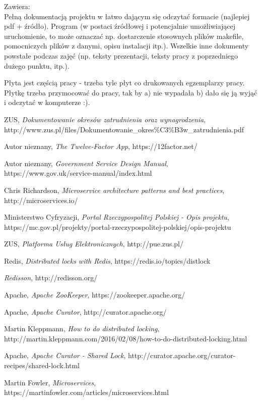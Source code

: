 \documentclass[licencjacka]{pracamgr}
\begin{document}
Zawiera:\\
Pełną dokumentacją projektu w łatwo dającym się odczytać formacie (najlepiej pdf + źródło).
Program (w postaci źródłowej i potencjalnie umożliwiającej uruchomienie, to może oznaczać np. dostarczenie stosownych plików makefile, pomocniczych plików z danymi, opisu instalacji itp.).
Wszelkie inne dokumenty powstałe podczas zajęć (np. teksty prezentacji, teksty pracy z poprzedniego dużego punktu, itp.).

Płyta jest częścią pracy - trzeba tyle płyt co drukowanych egzemplarzy pracy. Płytkę trzeba przymocować do pracy, tak by a) nie wypadała b) dało się ją wyjąć i odczytać w komputerze :).

\begin{thebibliography}{99}

 ZUS, \textit{Dokumentowanie okresów zatrudnienia oraz
	wynagrodzenia}, http://www.zus.pl/files/Dokumentowanie\_okres\%C3\%B3w\_zatrudnienia.pdf

 Autor nieznany, \textit{The Twelve-Factor App}, https://12factor.net/

 Autor nieznany, \textit{Government Service Design Manual},
https://www.gov.uk/service-manual/index.html

 Chris Richardson, \textit{Microservice architecture patterns and best practices},
http://microservices.io/

 Ministerstwo Cyfryzacji, \textit{Portal Rzeczypospolitej Polskiej - Opis projektu},
https://mc.gov.pl/projekty/portal-rzeczypospolitej-polskiej/opis-projektu

 ZUS, \textit{Platforma Usług Elektronicznych},
http://pue.zus.pl/

 Redis, \textit{Distributed locks with Redis},
https://redis.io/topics/distlock

 \textit{Redisson},
http://redisson.org/

 Apache, \textit{Apache ZooKeeper},
https://zookeeper.apache.org/

 Apache, \textit{Apache Curator},
http://curator.apache.org/

 Martin Kleppmann, \textit{How to do distributed locking},
http://martin.kleppmann.com/2016/02/08/how-to-do-distributed-locking.html

 Apache, \textit{Apache Curator - Shared Lock},
http://curator.apache.org/curator-recipes/shared-lock.html

 Martin Fowler, \textit{Microservices},
https://martinfowler.com/articles/microservices.html

\end{thebibliography}
\end{document}
